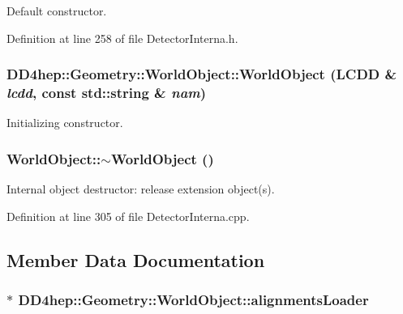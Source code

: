 Default constructor. 

Definition at line 258 of file DetectorInterna.h.\hypertarget{class_d_d4hep_1_1_geometry_1_1_world_object_af5a61cf32fba3494a3dca40bb1cdb235}{
\subsubsection[{WorldObject}]{\setlength{\rightskip}{0pt plus 5cm}DD4hep::Geometry::WorldObject::WorldObject ({\bf LCDD} \& {\em lcdd}, \/  const std::string \& {\em nam})}}
\label{class_d_d4hep_1_1_geometry_1_1_world_object_af5a61cf32fba3494a3dca40bb1cdb235}


Initializing constructor. \hypertarget{class_d_d4hep_1_1_geometry_1_1_world_object_a287e5b87a26133cd35f3015268d2a5a3}{
\subsubsection[{$\sim$WorldObject}]{\setlength{\rightskip}{0pt plus 5cm}WorldObject::$\sim$WorldObject ()}}
\label{class_d_d4hep_1_1_geometry_1_1_world_object_a287e5b87a26133cd35f3015268d2a5a3}


Internal object destructor: release extension object(s). 

Definition at line 305 of file DetectorInterna.cpp.

\subsection{Member Data Documentation}
\hypertarget{class_d_d4hep_1_1_geometry_1_1_world_object_ad14e95056a1b64557678f283364098fa}{
\subsubsection[{alignmentsLoader}]{$\ast$ {\bf DD4hep::Geometry::WorldObject::alignmentsLoader}}}
\label{class_d_d4hep_1_1_geometry_1_1_world_object_ad14e95056a1b64557678f283364098fa}


